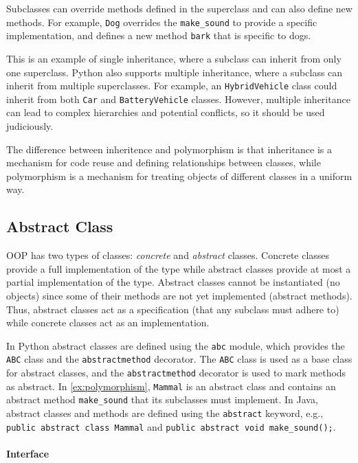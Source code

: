 \documentclass[oneside,11pt,dvipsnames]{book}
\newcommand{\code}[1]{\texttt{#1}}
\begin{document}
Subclasses can override methods defined in the superclass and can also define new methods. For example, \code{Dog} overrides the
\code{make\_sound} to provide a specific implementation, and defines a new method \code{bark} that is specific to dogs.

This is an example of single inheritance, where a subclass can inherit from only one superclass. Python also supports multiple inheritance, where a subclass can inherit from multiple superclasses. For example, an \code{HybridVehicle} class could inherit from both \code{Car} and \code{BatteryVehicle} classes. However, multiple inheritance can lead to complex hierarchies and potential conflicts, so it should be used judiciously.

The difference between inheritence and polymorphism is that inheritance is a mechanism for code reuse and defining relationships between classes, while polymorphism is a mechanism for treating objects of different classes in a uniform way. 
\subsection{Abstract Class}
OOP has two types of classes: \emph{concrete} and \emph{abstract} classes. Concrete classes provide a full implementation of the type while abstract classes provide at most a partial implementation of the type. 
Abstract classes cannot be instantiated (no objects) since some of their methods are not yet implemented (abstract methods). 
Thus, abstract classes act as a specification (that any subclass must adhere to) while concrete classes act as an implementation.



In Python abstract classes are defined using the \code{abc} module, which provides the \code{ABC} class and the \code{abstractmethod} decorator. The \code{ABC} class is used as a base class for abstract classes, and the \code{abstractmethod} decorator is used to mark methods as abstract. In \autoref{ex:polymorphism},
\code{Mammal} is an abstract class and contains an abstract method \code{make\_sound} that its subclasses must implement.
In Java, abstract classes and methods are defined using the \code{abstract} keyword, e.g., \code{public abstract class Mammal} and \code{public abstract void make\_sound();}.

\paragraph{Interface}
\end{document}
